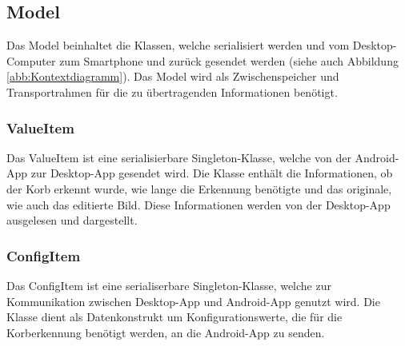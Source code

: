 \subsection{Model}
Das Model beinhaltet die Klassen, welche serialisiert werden und vom Desktop-Computer zum Smartphone und 
zurück gesendet werden (siehe auch Abbildung \ref{abb:Kontextdiagramm}).
Das Model wird als Zwischenspeicher und Transportrahmen für die zu übertragenden Informationen benötigt.
\subsubsection{ValueItem}
Das ValueItem ist eine serialisierbare Singleton-Klasse, welche von der Android-App 
zur Desktop-App gesendet wird. Die Klasse enthält die Informationen, ob der Korb 
erkennt wurde, wie lange die Erkennung benötigte und das originale, wie auch das editierte Bild. 
Diese Informationen werden von der Desktop-App ausgelesen und dargestellt. 

\subsubsection{ConfigItem}
Das ConfigItem ist eine serialiserbare Singleton-Klasse, welche zur Kommunikation 
zwischen Desktop-App und Android-App genutzt wird. Die Klasse dient als Datenkonstrukt 
um Konfigurationswerte, die für die Korberkennung benötigt werden, an die Android-App zu senden.

            
            
